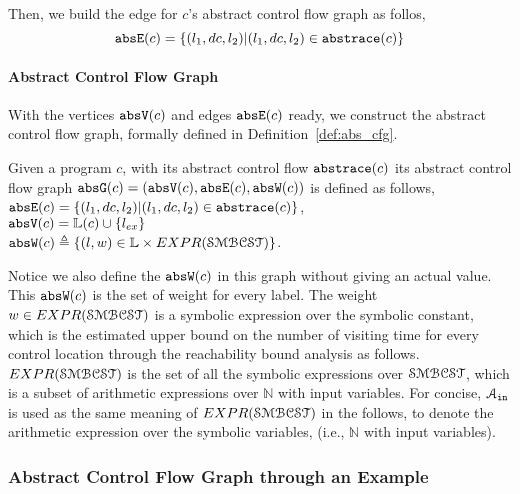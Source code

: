 Then, we build the edge for $c$'s abstract control flow graph as follos,
\[
  \mathtt{abs}{\mathtt{E}}(c) = \{(l_1, dc, l_2) | (l_1, dc, l_2) \in \mathtt{abs}{\mathtt{trace}}(c)\}
  \]

%
\paragraph{Abstract Control Flow Graph} 
With the vertices $\mathtt{abs}{\mathtt{V}}(c)$ and edges $\mathtt{abs}{\mathtt{E}}(c)$ ready, we construct the abstract control flow graph, formally 
defined in 
Definition~\ref{def:abs_cfg}.
%
\begin{defn}
\label{def:abs_cfg}
Given a program $c$, 
with its abstract control flow $\mathtt{abs}{\mathtt{trace}}(c)$
its abstract control flow graph $\mathtt{abs}{\mathtt{G}}(c) =(\mathtt{abs}{\mathtt{V}}(c), \mathtt{abs}{\mathtt{E}}(c), \mathtt{abs}{\mathtt{W}}(c))$ is defined as follows,
\\
$\mathtt{abs}{\mathtt{E}}(c) = \{(l_1, dc, l_2) | (l_1, dc, l_2) \in \mathtt{abs}{\mathtt{trace}}(c)\}$,
\\
$\mathtt{abs}{\mathtt{V}}(c) = \mathbb{L}(c)\cup\{l_{ex}\}$
\\
 $\absW(c) 
\triangleq \left\{ (l, w) \in \mathbb{L} \times EXPR(\constdom) \right\}$.
\end{defn}
Notice we also define the $\mathtt{abs}{\mathtt{W}}(c)$ in this graph without giving an actual value.
This $\mathtt{abs}{\mathtt{W}}(c)$ is the set of weight for every 
label. The weight $w \in EXPR(\mathcal{SMBCST})$ is a symbolic expression over the symbolic constant, 
which is the estimated upper bound on the number of visiting time for every control location
through the reachability bound analysis as follows.
%
$EXPR(\mathcal{SMBCST})$ is the set of all the symbolic expressions 
over $\mathcal{SMBCST}$, which is a subset of arithmetic expressions over $\mathbb{N}$ with input variables.
For concise, $\mathcal{A}_{\mathtt{in}}$ is used as the same meaning of $EXPR(\mathcal{SMBCST})$ in the follows, to denote the arithmetic expression 
over the symbolic variables, (i.e., $\mathbb{N}$ with input variables).
\subsubsection{Abstract Control Flow Graph through an Example}

